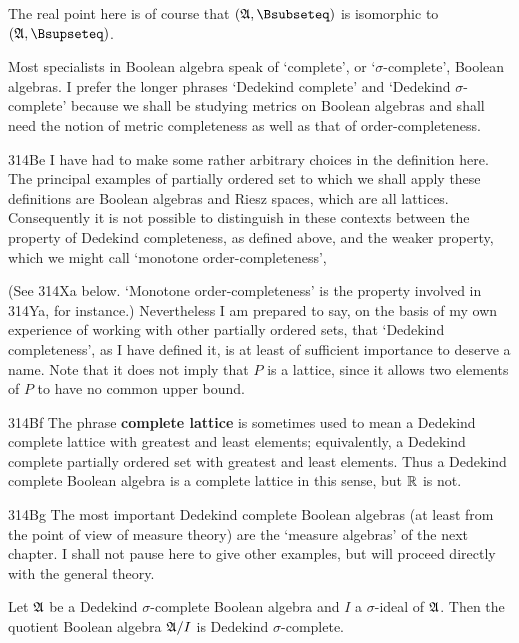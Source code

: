 {The real point here is of course that $(\frak A,\Bsubseteq)$ is
isomorphic to $(\frak A,\Bsupseteq)$.

 Most specialists in Boolean algebra speak of
`complete', or `$\sigma$-complete', Boolean algebras.   I prefer the
longer phrases `Dedekind complete' and
`Dedekind $\sigma$-complete' because we shall be studying metrics on
Boolean algebras and shall need the notion of metric completeness as
well as that of order-completeness.

\spheader 314Be I have had to make some rather arbitrary choices in the
definition here.   The principal examples of partially ordered set to
which we shall apply these definitions are Boolean algebras and Riesz
spaces, which are all lattices.   Consequently it is not possible to
distinguish in these contexts between the property of Dedekind
completeness, as defined above, and the weaker property, which we might
call `monotone order-completeness',


\noindent (See 314Xa below.   `Monotone order-completeness' is the
property involved in 314Ya, for instance.)   Nevertheless I am prepared
to say, on the
basis of my own experience of working with other partially ordered sets,
that `Dedekind completeness', as I have defined it, is at least of
sufficient importance to deserve a name.   Note that it does not imply
that $P$ is a lattice, since it allows two elements of $P$ to have no
common upper bound.

\spheader 314Bf The phrase {\bf complete lattice} is sometimes used to
mean a Dedekind complete lattice with greatest and least elements;
equivalently, a Dedekind complete partially ordered set with greatest
and least elements.   Thus a Dedekind complete Boolean algebra is a
complete lattice in this sense, but $\Bbb R$ is not.

\spheader 314Bg The most important Dedekind complete Boolean
algebras (at least from the point of view of measure theory) are the
`measure algebras' of the next chapter.   I shall not pause here to give
other examples, but will proceed directly with the general theory.
}%

 Let $\frak A$ be a Dedekind $\sigma$-complete
Boolean algebra and $I$ a $\sigma$-ideal of $\frak A$.   Then the
quotient Boolean algebra $\frak A/I$ is Dedekind $\sigma$-complete.

